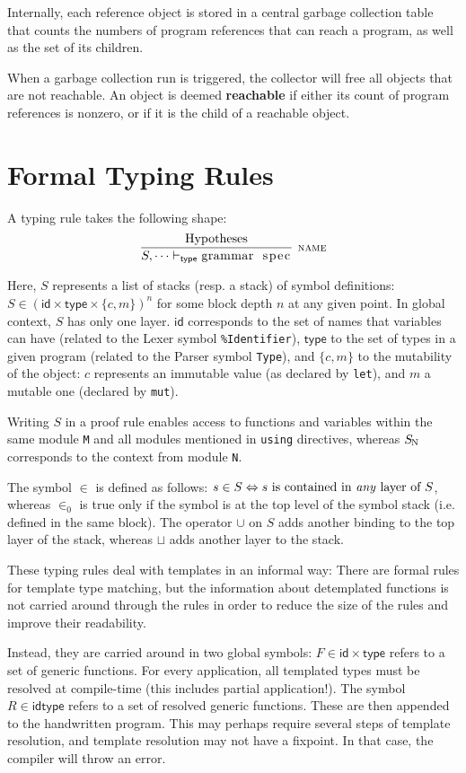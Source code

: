 \documentclass{article}
\newcommand{\code}[1]{\lstinline[columns=fixed]{#1}}
\newcommand{\drmrule}[5]{\frac{#1}{#2\vdash_{\mathsf{#3}}#4}\textsc{\ \small{#5}}}
\newcommand{\mc}[1]{\textnormal{\code{#1}}}
\begin{document}
		Internally, each reference object is stored in a central garbage collection table that counts the numbers of program references that can reach a program, as well as the set of its children.
		
		When a garbage collection run is triggered, the collector will free all objects that are not reachable. An object is deemed \textbf{reachable} if either its count of program references is nonzero, or if it is the child of a reachable object.
		
	\section{Formal Typing Rules}
	
		A typing rule takes the following shape: $$ \drmrule{\mathrm{Hypotheses}}{S,\dots}{type}{\mc{grammar spec}}{name} $$
		
		Here, $S$ represents a list of stacks (resp. a stack) of symbol definitions: $S \in (\mathsf{id} \times \mathsf{type} \times \{c,m\})^n$ for some block depth $n$ at any given point. In global context, $S$ has only one layer. $\mathsf{id}$ corresponds to the set of names that variables can have (related to the Lexer symbol \texttt{\%Identifier}), $\mathsf{type}$ to the set of types in a given program (related to the Parser symbol \texttt{Type}), and $\{c,m\}$ to the mutability of the object: $c$ represents an immutable value (as declared by \code{let}), and $m$ a mutable one (declared by \code{mut}).
		
		Writing $S$ in a proof rule enables access to functions and variables within the same module \code{M} and all modules mentioned in \code{using} directives, whereas $S_{\mc{N}}$ corresponds to the context from module \code{N}.
		
		The symbol $\in$ is defined as follows: $s\in S \Leftrightarrow \textnormal{$s$ is contained in \textit{any} layer of $S$}$, whereas $\in_0$ is true only if the symbol is at the top level of the symbol stack (i.e. defined in the same block). The operator $\cup$ on $S$ adds another binding to the top layer of the stack, whereas $\sqcup$ adds another layer to the stack.
		
		These typing rules deal with templates in an informal way: There are formal rules for template type matching, but the information about detemplated functions is not carried around through the rules in order to reduce the size of the rules and improve their readability.
		
		Instead, they are carried around in two global symbols: $F \in \mathsf{id} \times \mathsf{type}$ refers to a set of generic functions. For every application, all templated types must be resolved at compile-time (this includes partial application!). The symbol $R \in \mathsf{id} \mathsf{type}$ refers to a set of resolved generic functions. These are then appended to the handwritten program. This may perhaps require several steps of template resolution, and template resolution may not have a fixpoint. In that case, the compiler will throw an error.
		
\end{document}
